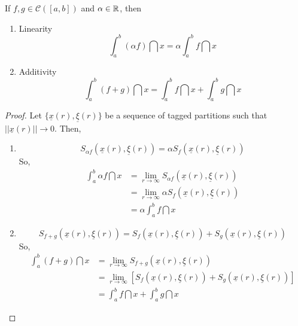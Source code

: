\begin{theorem}
    If $f, g \in \mathcal{C}([a,b])$ and $\alpha \in \mathbb{R}$, then
    \begin{enumerate}
        \item Linearity
            \begin{equation}
                \int_a^b (\alpha f) \dint x = \alpha \int_a^b f \dint x
            \end{equation}
        \item Additivity
            \begin{equation}
                \int_a^b (f + g)\dint x = \int_a^b f \dint x + \int_a^b g \dint x
            \end{equation}
    \end{enumerate}
\end{theorem}

\begin{proof}
     Let $\{\underline{x}(r), \underline{\xi}(r)\}$ be a sequence of tagged partitions such that $||\underline{x}(r)|| \to 0$. Then,
    \begin{enumerate}
        \item
            \begin{equation*}
                S_{\alpha f} (\underline{x}(r), \underline{\xi}(r))  = \alpha S_f(\underline{x}(r), \underline{\xi}(r))
            \end{equation*}
            So,
            \begin{align*}
                \int_a^b \alpha f \dint x &= \lim \limits_{r \to \infty} S_{\alpha f}(\underline{x}(r), \underline{\xi}(r)) \\
                &= \lim \limits_{r \to \infty} \alpha S_f(\underline{x}(r), \underline{\xi}(r)) \\
                &= \alpha \int_a^b f \dint x
            \end{align*}
        \item 
            \begin{equation*}
                S_{f + g}(\underline{x}(r), \underline{\xi}(r)) = S_f(\underline{x}(r), \underline{\xi}(r)) + S_g(\underline{x}(r), \underline{\xi}(r))
            \end{equation*}
            So,
            \begin{align*}
                \int_a^b (f+g) \dint x &= \lim \limits_{r \to \infty}S_{f + g}(\underline{x}(r), \underline{\xi}(r)) \\
                &= \lim \limits_{r \to \infty}[ S_f(\underline{x}(r), \underline{\xi}(r)) + S_g(\underline{x}(r), \underline{\xi}(r))] \\
                &= \int_a^b f \dint x + \int_a^b g \dint x
            \end{align*}
    \end{enumerate}
\end{proof}

